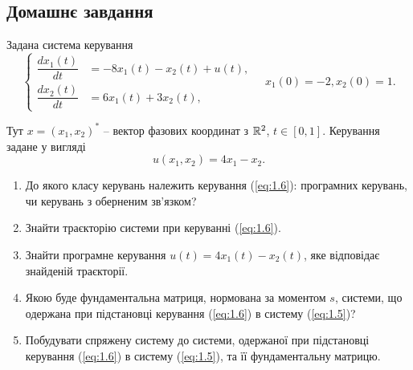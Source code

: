 
\subsection{Домашнє завдання}

\begin{problem}
	Задана система керування 
	\begin{equation}
		\label{eq:1.5}
		\left\{
			\begin{aligned}
				\dfrac{dx_1(t)}{dt} &= -8x_1(t)  -x_2(t) + u(t),\\
				\dfrac{dx_2(t)}{dt} &= 6x_1(t) + 3x_2(t),
			\end{aligned}
		\right.
		\quad
		x_1(0) = -2, x_2(0) = 1.
	\end{equation}

	Тут $ x =(x_1, x_2)^*$ -- вектор фазових координат з $\mathbb{R}^2$, $t \in [0, 1]$. Керування задане у вигляді
	\begin{equation}
		\label{eq:1.6}
		u(x_1, x_2) = 4x_1 - x_2.
	\end{equation}

	\begin{enumerate}
		\item До якого класу керувань належить керування (\ref{eq:1.6}): програмних керувань, чи керувань з оберненим зв'язком?
		\item Знайти траєкторію системи при керуванні (\ref{eq:1.6}).
		\item Знайти програмне керування $u(t) = 4x_1(t) - x_2(t)$, яке відповідає знайденій траєкторії.
		\item Якою буде фундаментальна матриця, нормована за моментом $s$, системи, що одержана при підстановці керування (\ref{eq:1.6}) в систему (\ref{eq:1.5})?
		\item Побудувати спряжену систему до системи, одержаної при підстановці керування (\ref{eq:1.6}) в систему (\ref{eq:1.5}), та її фундаментальну матрицю.
	\end{enumerate}
\end{problem}

